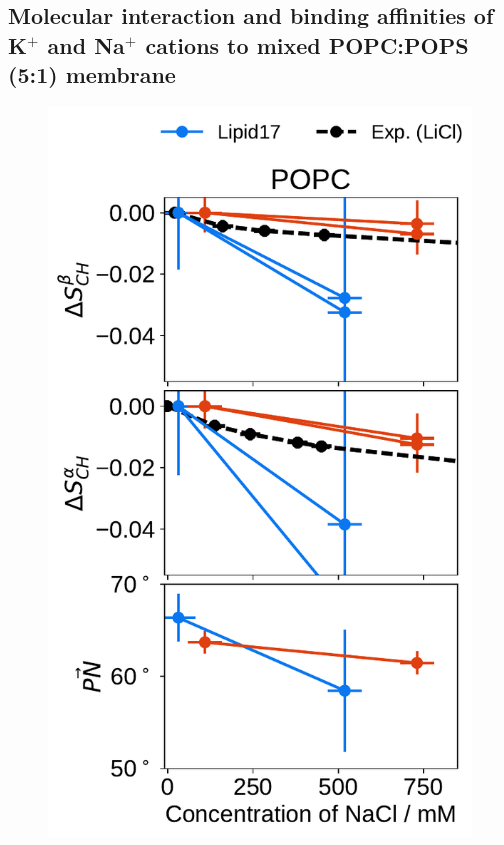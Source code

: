 \documentclass[journal=jpcbfk,manuscript=article]{achemso}
\newlength{\figwidth}
\newlength{\figwidthsmall}
\begin{document}
 
 
 


\subsection{Molecular interaction and binding affinities of K$^+$ and Na$^+$ cations to mixed POPC:POPS (5:1) membrane} 
\label{sec:affinity} 

 
 
\begin{figure}[tbp!] 
  \centering 
  \includegraphics[width=\figwidthsmall]{../img/ecc_pops/order_parameters_changes_ecc-lip_L14_A-B-PN-COO_POPC_nacl.pdf} 

\end{figure}
\end{document}
